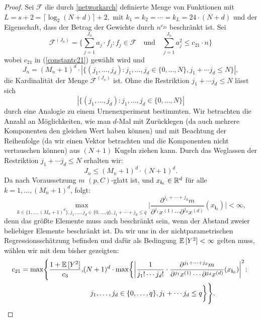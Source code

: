 \begin{proof}
Sei $\mathcal{F}$ die durch \ref{networkarch} definierte Menge von Funktionen mit $L = s + 2 = \lceil\log_2(N + d)\rceil + 2,$ mit $k_1 = k_2 = \cdots = k_L = 24 \cdot (N + d)$ und der Eigenschaft, dass der Betrag der Gewichte durch $n^{c_{20}}$ beschränkt ist. Sei 
$$ \mathcal{F}^{(J_n)} = \biggl\{\sum_{j = 1}^{J_n} a_j \cdot f_j : f_j \in \mathcal{F} \quad \text{und} \quad \sum_{j = 1}^{J_n} a_j^2 \leq c_{21} \cdot n \biggr\}$$
wobei $c_{21}$ in (\ref{constantc21}) gewählt wird und
$$J_n = (M_n + 1)^d \cdot |\{(j_1,\dots,j_d) : j_1,\dots,j_d \in \{0,\dots,N\}, j_1 + \cdots j_d \leq N\}|,$$ 
die Kardinalität der Menge $\mathcal{F}^{(J_n)}$ ist. 
Ohne die Restriktion $j_1 + \cdots j_d \leq N$ lässt sich $$|\{(j_1,\dots,j_d) : j_1,\dots,j_d \in \{0,\dots,N\}|$$ durch eine Analogie zu  einem Urnenexperiment bestimmten. Wir betrachten die Anzahl an Möglichkeiten, wie man $d$-Mal mit Zurücklegen (da auch mehrere Komponenten den gleichen Wert haben können) und mit Beachtung der Reihenfolge (da wir einen Vektor betrachten und die Komponenten nicht vertauschen können) aus $(N + 1)$ Kugeln ziehen kann. Durch das Weglassen der Restriktion $j_1 + \cdots j_d \leq N$ erhalten wir:
\begin{equation}
\label{jn}
J_n \leq (M_n + 1)^d \cdot (N + 1)^d.
\end{equation}
Da nach Voraussetzung $m$ $(p,C)$-glatt ist, und $x_{\mathbf{i}_k} \in \mathbb{R}^d$ für alle $k = 1,\dots,(M_n + 1)^d$, folgt:
\begin{equation}
\label{bound}
\max_{k \in \{1,\dots,(M_n + 1)^d\}, j_1,\dots,j_d \in\{0,\dots,q\}, j_1+\cdots+j_d \leq q} \bigg| \frac{\partial^{j_1+\cdots + j_d} m}{\partial^{j_1} x^{(1)}\cdots \partial^{j_d} x^{(d)}}(x_{\mathbf{i}_k})\bigg| < \infty,
\end{equation}
denn das größte Elemente muss auch beschränkt sein, wenn der Abstand zweier beliebiger Elemente beschränkt ist.
Da wir uns in der nichtparametrischen Regressionsschätzung befinden und dafür als Bedingung $\mathbb{E}\,[Y^2] < \infty$ gelten muss, wählen wir mit dem bisher gezeigten:
\begin{equation}
\label{constantc21}
\begin{split}
c_{21} = \max\Biggl\{\frac{1 + \E[Y^2]}{c_3}, & (N + 1)^d \cdot \max\biggl\{\bigg| \frac{1}{j_1! \cdots j_d!} \cdot \frac{\partial^{j_1+\cdots + j_d} m}{\partial^{j_1} x^{(1)}\cdots \partial^{j_d} x^{(d)}}(x_{\mathbf{i}_k})\bigg|^2 \colon \\
& \quad j_1,\dots,j_d \in \{0,\dots,q\}, j_1 + \cdots j_d \leq q\biggr\}\Biggr\}.
\end{split}

\end{equation}
\end{proof}
